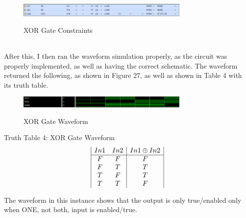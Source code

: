 \documentclass{article}
\begin{document}
\begin{figure}[!htbp]
    \centering
    \caption{XOR Gate Constraints}
    \includegraphics[width=0.75\textwidth]{XOR-GATE-CONSTRAINTS.png}
    \label{XOR Gate, Constrants}
\end{figure}\\
After this, I then ran the waveform simulation properly, as the circuit was properly implemented, as well as having the correct schematic. The waveform returned the following, as shown in Figure 27, as well as shown in Table 4 with its truth table.
\begin{figure}[!htbp]
    \centering
    \caption{XOR Gate Waveform}
    \includegraphics[width=0.75\textwidth]{XOR-GATE-WAVEFORM.png}
    \label{XOR Gate, Waveform}
\end{figure}
\begin{center}
    Truth Table 4: XOR Gate Waveform
    \begin{displaymath}
    \begin{array}{|c c|c|}
    In1 & In2 & In1 \oplus In2\\
    \hline
    F & F & F\\
    F & T & T\\
    T & F & T\\
    T & T & F\\
    \end{array}
    \end{displaymath}
\end{center}
The waveform in this instance shows that the output is only true/enabled only when ONE, not both, input is enabled/true.
\newpage %
\end{document}
